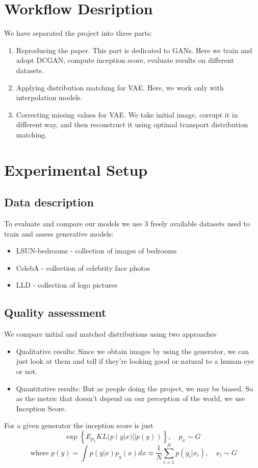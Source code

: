 \documentclass{article}
\begin{document}
\section{Workflow Desription}
We have separated the project into three parts:

\begin{enumerate}
    \item Reproducing the paper. This part is dedicated to GANs. 
        Here we train and adopt DCGAN,
        compute inception score, evaluate results on 
        different datasets.

    \item Applying distribution matching for VAE. Here, we work
        only with interpolation models.

    \item Correcting missing values for VAE. We take 
        initial image, corrupt it in different way, 
        and then reconstruct 
        it using optimal transport distribution matching.
\end{enumerate}

\section{Experimental Setup}
\subsection{Data description}
To evaluate and compare our models we use 3 freely available datasets used to train and assess generative models:
\begin{itemize}
    \item LSUN-bedrooms - collection of images of bedrooms
    \item CelebA - collection of celebrity face photos
    \item LLD - collection of logo pictures
\end{itemize}

\subsection{Quality assessment}
We compare initial and matched distributions using two approaches
\begin{itemize}
    \item Qualitative results: Since we obtain images by using the generator, we can just look at them and tell if they're looking good or natural to a human eye or not.
    \item Quantitative results: But as people doing the project, we may be biased. So as the metric that doesn't depend on our perception of the world, we use Inception Score. 
\end{itemize}
For a given generator the inception score is just
    $$
    \exp \left\{ {E_{p_x}KL(p(y|x) || p(y))} \right\},\quad p_x \sim G$$
    $$ \text{ where } p(y) = \int p(y|x)p_g(x) dx \approx \frac{1}{N}\sum_{i=1}^{N} p(y_i|x_i), \quad  x_i \sim G
    $$
    
\end{document}
